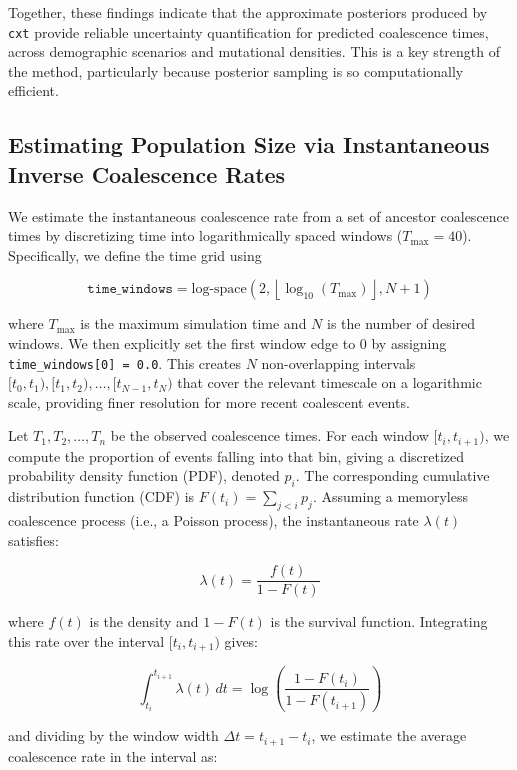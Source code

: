 \documentclass[9pt,twoside]{pnas-new} %
\newcommand{\cxtkit}{\texttt{cxt}\xspace}
\newcommand{\logspace}{\text{log-space}} %
\providecommand{\DIFdelbegin}{} %
\providecommand{\DIFdelend}{} %
\begin{document}
Together, these findings indicate that the approximate posteriors produced by \cxtkit 
provide reliable uncertainty quantification for predicted coalescence times,
across demographic scenarios and mutational densities.
This is a key strength of the method, particularly because
posterior sampling is so computationally efficient.


\DIFdelbegin %

\DIFdelend \subsection*{Estimating Population Size via Instantaneous Inverse Coalescence Rates}
\label{app:ne}

We estimate the instantaneous coalescence rate from a set of ancestor coalescence times by discretizing time into logarithmically spaced windows ($T_{\max}=40$). Specifically, we define the time grid using

\[
\texttt{time\_windows} = \logspace\left(2, \left\lfloor \log_{10}(T_{\max}) \right\rfloor, N + 1 \right)
\]

where $T_{\max}$ is the maximum simulation time and $N$ is the number of desired windows. 
We then explicitly set the first window edge to 0 by assigning \texttt{time\_windows[0] = 0.0}. 
This creates $N$ non-overlapping intervals $[t_0, t_1), [t_1, t_2), \dots, [t_{N-1}, t_N)$ 
that cover the relevant timescale on a logarithmic scale, providing finer resolution for more recent coalescent events. 

Let $T_1, T_2, \dots, T_n$ be the observed coalescence times. 
For each window $[t_i, t_{i+1})$, we compute the proportion of events 
falling into that bin, giving a discretized probability density function (PDF), 
denoted $p_i$. The corresponding cumulative distribution function (CDF) 
is $F(t_i) = \sum_{j < i} p_j$. Assuming a memoryless coalescence process (i.e., a Poisson process), 
the instantaneous rate $\lambda(t)$ satisfies:

\[
\lambda(t) = \frac{f(t)}{1 - F(t)}
\]

where $f(t)$ is the density and $1 - F(t)$ is the survival function. 
Integrating this rate over the interval $[t_i, t_{i+1})$ gives:

\[
\int_{t_i}^{t_{i+1}} \lambda(t) \, dt = \log\left( \frac{1 - F(t_i)}{1 - F(t_{i+1})} \right)
\]

and dividing by the window width $\Delta t = t_{i+1} - t_i$, 
we estimate the average coalescence rate in the interval as:
\end{document}
